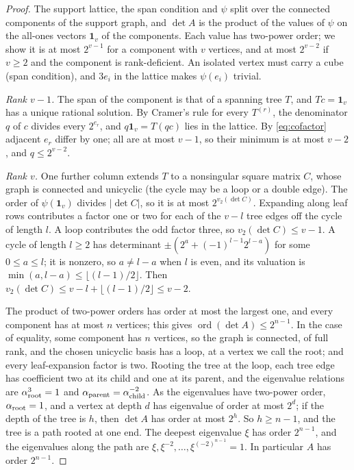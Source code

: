 \documentclass[11pt,a4paper]{article}
\theoremstyle{definition}
\newcommand{\one}{\mathbf{1}}
\newcommand{\ord}{\operatorname{ord}}
\begin{document}
\begin{proof}
The support lattice, the span condition and $\psi$ split over the connected
components of the support graph, and $\det A$ is the product of the values of
$\psi$ on the all-ones vectors $\one_v$ of the components. Each value has
two-power order; we show it is at most $2^{v-1}$ for a component with $v$
vertices, and at most $2^{v-2}$ if $v\ge2$ and the component is rank-deficient.
An isolated vertex must carry a cube (span condition), and $3e_i$ in the
lattice makes $\psi(e_i)$ trivial.

\emph{Rank $v-1$.} The span of the component is that of a spanning tree $T$,
and $Tc=\one_v$ has a unique rational solution. By Cramer's rule for every
$T^{(r)}$, the denominator $q$ of $c$ divides every $2^{e_r}$, and
$q\one_v=T(qc)$ lies in the lattice. By \eqref{eq:cofactor} adjacent $e_r$
differ by one; all are at most $v-1$, so their minimum is at most $v-2$, and
$q\le2^{v-2}$.

\emph{Rank $v$.} One further column extends $T$ to a nonsingular square
matrix $C$, whose graph is connected and unicyclic (the cycle may be a loop or
a double edge). The order of $\psi(\one_v)$ divides $|\det C|$, so it is at
most $2^{v_2(\det C)}$. Expanding along leaf rows contributes a factor one or
two for each of the $v-l$ tree edges off the cycle of length $l$. A loop
contributes the odd factor three, so $v_2(\det C)\le v-1$. A cycle of length
$l\ge2$ has determinant $\pm(2^a+(-1)^{l-1}2^{l-a})$ for some $0\le a\le l$;
it is nonzero, so $a\ne l-a$ when $l$ is even, and its valuation is
$\min(a,l-a)\le\lfloor(l-1)/2\rfloor$. Then $v_2(\det C)\le v-l+
\lfloor(l-1)/2\rfloor\le v-2$.

The product of two-power orders has order at most the largest one, and every
component has at most $n$ vertices; this gives $\ord(\det A)\le2^{n-1}$. In the
case of equality, some component has $n$ vertices, so the graph is connected,
of full rank, and the chosen unicyclic basis has a loop, at a vertex we call
the root; and every leaf-expansion factor is two. Rooting the tree at the
loop, each tree edge has coefficient two at its child and one at its parent,
and the eigenvalue relations are $\alpha_{\rm root}^3=1$ and
$\alpha_{\rm parent}=\alpha_{\rm child}^{-2}$. As the eigenvalues have two-power
order, $\alpha_{\rm root}=1$, and a vertex at depth $d$ has eigenvalue of order
at most $2^d$; if the depth of the tree is $h$, then $\det A$ has order at most
$2^h$. So $h\ge n-1$, and the tree is a path rooted at one end. The deepest
eigenvalue $\xi$ has order $2^{n-1}$, and the eigenvalues along the path are
$\xi,\xi^{-2},\dots,\xi^{(-2)^{n-1}}=1$. In particular $A$ has order $2^{n-1}$.


\end{proof}
\end{document}
